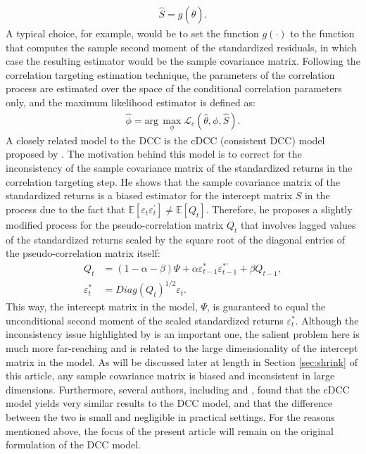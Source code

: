 \begin{align}
	\widehat{S} = g(\widehat{\theta}).
\end{align}
A typical choice, for example, would be to set the function $g(\cdot)$ to the function that computes the sample second moment of the standardized residuals, in which case the resulting estimator would be the sample covariance matrix. Following the correlation targeting estimation technique, the parameters of the correlation process are estimated over the space of the conditional correlation parameters only, and the maximum likelihood estimator is defined as:
\begin{align}
	\widehat{\phi} = \text{arg}\, \max_{\phi}{\mathcal{L}_c( \widehat{\theta},\phi,\widehat{S})}.
\end{align}
A closely related model to the DCC is the cDCC (consistent DCC) model proposed by \textcite{AIELLI2013}. The motivation behind this model is to correct for the inconsistency of the sample covariance matrix of the standardized returns in the correlation targeting step. He shows that the sample covariance matrix of the standardized returns is a biased estimator for the intercept matrix $S$ in the process due to the fact that $\mathbb{E}[\varepsilon_t\varepsilon_t^\prime] \neq \mathbb{E}[Q_t]$. Therefore, he proposes a slightly modified process for the pseudo-correlation matrix $Q_t$ that involves lagged values of the standardized returns scaled by the square root of the diagonal entries of the pseudo-correlation matrix itself:
\begin{align}
	Q_t &= (1-\alpha-\beta) \Psi + \alpha \varepsilon_{t-1}^{*} \varepsilon_{t-1}^{*\prime} + \beta Q_{t-1}, \\
	\varepsilon_{t}^* &= Diag(Q_t)^{1/2}\varepsilon_t.
\end{align}
This way, the intercept matrix in the model, $\Psi$, is guaranteed to equal the unconditional second moment of the scaled standardized returns $\varepsilon_t^*$. Although the inconsistency issue highlighted by \textcite{AIELLI2013} is an important one, the salient problem here is much more far-reaching and is related to the large dimensionality of the intercept matrix in the model. As will be discussed later at length in Section \ref{sec:shrink} of this article, any sample covariance matrix is biased and inconsistent in large dimensions. Furthermore, several authors, including \textcite{HAFNER2012} and \textcite{ELW2019}, found that the cDCC model yields very similar results to the DCC model, and that the difference between the two is small and negligible in practical settings. For the reasons mentioned above, the focus of the present article will remain on the original formulation of the DCC model.
